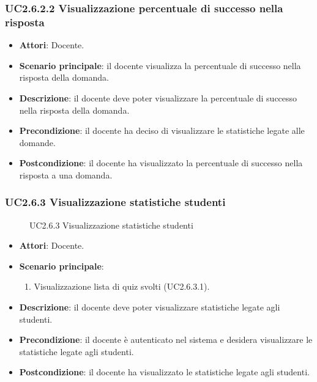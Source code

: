 \subsubsection{UC2.6.2.2 Visualizzazione percentuale di successo nella risposta}
\begin{itemize}
\item \textbf{Attori}: Docente.
\item \textbf{Scenario principale}: il docente visualizza la percentuale di successo nella risposta della domanda.
\item \textbf{Descrizione}: il docente deve poter visualizzare la percentuale di successo nella risposta della domanda.
\item \textbf{Precondizione}: il docente ha deciso di visualizzare le statistiche legate alle domande.
\item \textbf{Postcondizione}: il docente ha visualizzato la percentuale di successo nella risposta a una domanda.
\end{itemize}
\subsubsection{UC2.6.3 Visualizzazione statistiche studenti}
\begin{figure}[H]
\centering
\noindent{}
\caption{UC2.6.3 Visualizzazione statistiche studenti}
\end{figure}
\begin{itemize}
\item \textbf{Attori}: Docente.
\item \textbf{Scenario principale}:
\begin{enumerate}
\item Visualizzazione lista di quiz svolti (UC2.6.3.1).
\end{enumerate}
\item \textbf{Descrizione}:  il docente deve poter visualizzare statistiche legate agli studenti.
\item \textbf{Precondizione}: il docente è autenticato nel sistema e desidera visualizzare le statistiche legate agli studenti.
\item \textbf{Postcondizione}: il docente ha visualizzato le statistiche legate agli studenti.
\end{itemize}
